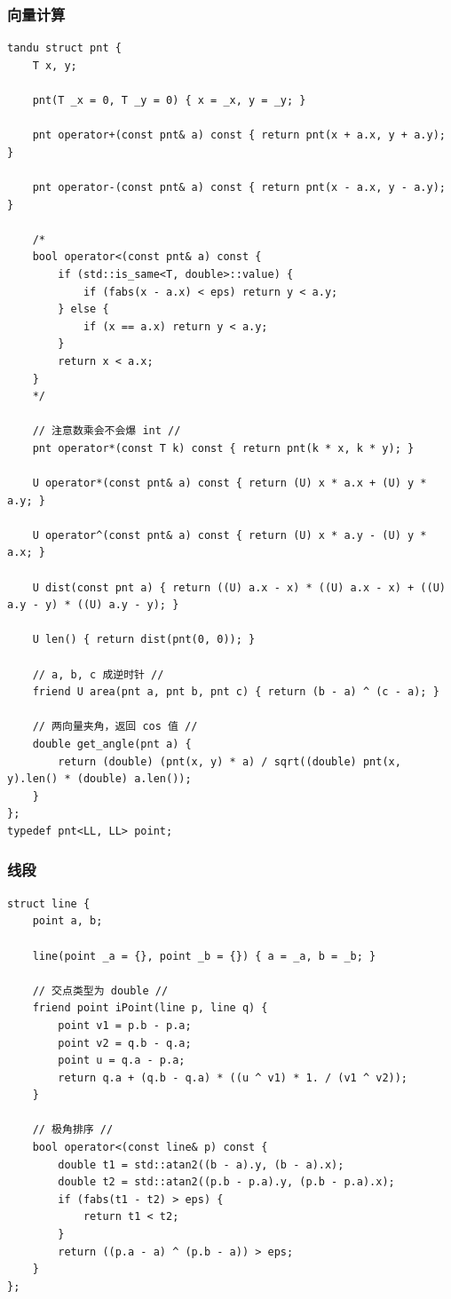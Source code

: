 \documentclass[UTF8, a4paper, titlepage, twoside]{ctexart}
\begin{document}
\subsubsection{ 向量计算 }
\begin{lstlisting}[style=cpp]
tandu struct pnt {
    T x, y;

    pnt(T _x = 0, T _y = 0) { x = _x, y = _y; }

    pnt operator+(const pnt& a) const { return pnt(x + a.x, y + a.y); }

    pnt operator-(const pnt& a) const { return pnt(x - a.x, y - a.y); }

    /*
    bool operator<(const pnt& a) const {
        if (std::is_same<T, double>::value) {
            if (fabs(x - a.x) < eps) return y < a.y;
        } else {
            if (x == a.x) return y < a.y;
        }
        return x < a.x;
    }
    */

    // 注意数乘会不会爆 int //
    pnt operator*(const T k) const { return pnt(k * x, k * y); }

    U operator*(const pnt& a) const { return (U) x * a.x + (U) y * a.y; }

    U operator^(const pnt& a) const { return (U) x * a.y - (U) y * a.x; }

    U dist(const pnt a) { return ((U) a.x - x) * ((U) a.x - x) + ((U) a.y - y) * ((U) a.y - y); }

    U len() { return dist(pnt(0, 0)); }

    // a, b, c 成逆时针 //
    friend U area(pnt a, pnt b, pnt c) { return (b - a) ^ (c - a); }

    // 两向量夹角，返回 cos 值 //
    double get_angle(pnt a) {
        return (double) (pnt(x, y) * a) / sqrt((double) pnt(x, y).len() * (double) a.len());
    }
};
typedef pnt<LL, LL> point;
\end{lstlisting}

\subsubsection{ 线段 }
\begin{lstlisting}
struct line {
    point a, b;

    line(point _a = {}, point _b = {}) { a = _a, b = _b; }

    // 交点类型为 double //
    friend point iPoint(line p, line q) {
        point v1 = p.b - p.a;
        point v2 = q.b - q.a;
        point u = q.a - p.a;
        return q.a + (q.b - q.a) * ((u ^ v1) * 1. / (v1 ^ v2));
    }

    // 极角排序 //
    bool operator<(const line& p) const {
        double t1 = std::atan2((b - a).y, (b - a).x);
        double t2 = std::atan2((p.b - p.a).y, (p.b - p.a).x);
        if (fabs(t1 - t2) > eps) {
            return t1 < t2;
        }
        return ((p.a - a) ^ (p.b - a)) > eps;
    }
};
\end{lstlisting}
\end{document}
